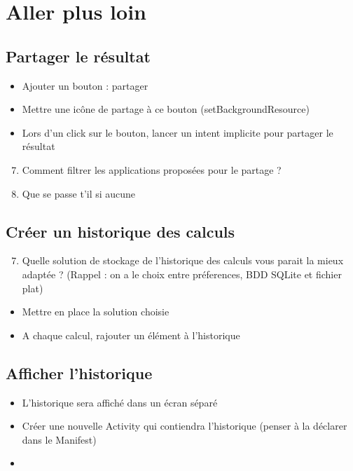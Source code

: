 \documentclass{article}
\begin{document}
\section{Aller plus loin}
\subsection{Partager le résultat}
\begin{itemize}
\item Ajouter un bouton : partager
\item Mettre une icône de partage à ce bouton (setBackgroundResource)
\item Lors d'un click sur le bouton, lancer un intent implicite pour partager le résultat
\end{itemize}
\begin{enumerate}
 \setcounter{enumi}{6}
\item Comment filtrer les applications proposées pour le partage ?
\item Que se passe t'il si aucune 
\end{enumerate}
\subsection{Créer un historique des calculs}
\begin{enumerate}
 \setcounter{enumi}{6}
\item Quelle solution de stockage de l'historique des calculs vous parait la mieux adaptée ? (Rappel : on a le choix entre préferences, BDD SQLite et fichier plat) 
\end{enumerate}
\begin{itemize}
\item Mettre en place la solution choisie
\item A chaque calcul, rajouter un élément à l'historique
\end{itemize}
\subsection{Afficher l'historique}
\begin{itemize}
\item L'historique sera affiché dans un écran séparé
\item Créer une nouvelle Activity qui contiendra l'historique (penser à la déclarer dans le Manifest)
\item 
\end{itemize}
\end{document}
